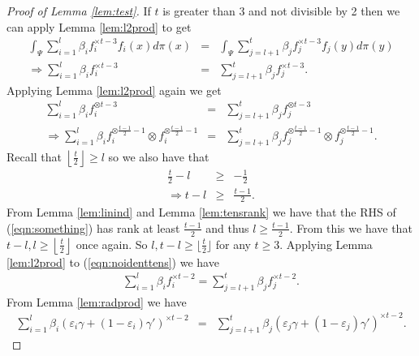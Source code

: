 \documentclass[aos,preprint]{imsart}
\def\l{\left}
\def\r{\right}
\theoremstyle{plain}
\theoremstyle{defintion}
\begin{document}
\begin{proof}[Proof of Lemma \ref{lem:test}]
		If $t$ is greater than 3 and not divisible by 2 then we can apply Lemma \ref{lem:l2prod} to get
		\begin{eqnarray*}
			\int_\Psi \sum_{i=1}^l \beta_i f_i^{\times t-3}f_i(x) d\pi(x) &=& \int_\Psi \sum_{j=l+1}^{t}\beta_j f_j^{\times t-3} f_j(y) d\pi(y)\\
			\Rightarrow  \sum_{i=1}^l \beta_i f_i^{\times t-3} &=&  \sum_{j=l+1}^{t}\beta_j f_j^{\times t-3}.
		\end{eqnarray*}
		Applying Lemma \ref{lem:l2prod} again we get
		\begin{eqnarray*} \label{eqn:something}
			\sum_{i=1}^l \beta_i f_i^{\otimes t-3 } &=&  \sum_{j=l+1}^{t}\beta_j f_j^{\otimes t-3 } \\
			\Rightarrow\sum_{i=1}^l \beta_i f_i^{\otimes \frac{t-1}{2} -1 } \otimes f_i^{\otimes \frac{t-1}{2} -1 } &=&  \sum_{j=l+1}^{t}\beta_j f_j^{\otimes \frac{t-1}{2} -1 } \otimes f_j^{\otimes \frac{t-1}{2} -1 }.
		\end{eqnarray*}
		Recall that $\l\lfloor \frac{t}{2} \r\rfloor \ge l$ so we also have that
		\begin{eqnarray*}
			\frac{t}{2} - l &\ge& -\frac{1}{2}\\
			\Rightarrow t-l &\ge& \frac{t-1}{2}.
		\end{eqnarray*}
		From Lemma \ref{lem:linind} and Lemma \ref{lem:tensrank} we have that the RHS of (\ref{eqn:something}) has rank at least $\frac{t-1}{2}$ and thus $l\ge \frac{t-1}{2}$. From this we have that $t-l,l\ge \l\lfloor \frac{t}{2}\r\rfloor$ once again. So $l,t-l \ge \lfloor \frac{t}{2}\rfloor$ for any $t\ge 3$. Applying Lemma \ref{lem:l2prod} to (\ref{eqn:noidenttens}) we have 
		\begin{eqnarray*}
			\sum_{i=1}^l \beta_i f_i^{\times t-2} = \sum_{j=l+1}^{t}\beta_j f_j^{\times t-2}.
		\end{eqnarray*}
		From Lemma \ref{lem:radprod} we have
		\begin{eqnarray*}
			\sum_{i=1}^l  \beta_i \left( \varepsilon_i \gamma + \left( 1-\varepsilon_i \right) \gamma' \right)^{\times t-2}   &=& \sum_{j=l+1}^{t} \beta_j \left( \varepsilon_j \gamma + \left( 1-\varepsilon_j \right) \gamma' \right)^{\times t-2}.
		\end{eqnarray*}
	\end{proof}
\end{document}
